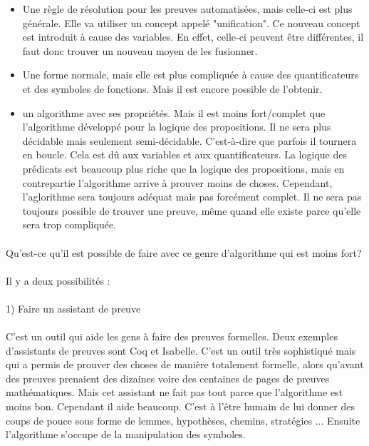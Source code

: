 \begin{itemize}

  \item Une règle de résolution pour les preuves automatisées, mais celle-ci est plus générale. Elle va utiliser un concept appelé "unification". Ce nouveau concept est introduit à cause des variables. En effet, celle-ci peuvent être différentes, il faut donc trouver un nouveau moyen de les fusionner.
  \item Une forme normale, mais elle est plus compliquée à cause des quantificateurs et des symboles de fonctions. Mais il est encore possible de l'obtenir.
  \item un algorithme avec ses propriétés. Mais il est moins fort/complet que l'algorithme développé pour la logique des propositions. Il ne sera plus décidable mais seulement semi-décidable. C'est-à-dire que parfois il tournera en boucle. Cela est dû aux variables et aux quantificateurs. La logique des prédicats est beaucoup plus riche que la logique des propositions, mais en contrepartie l'algorithme arrive à prouver moins de choses. Cependant, l'aglorithme sera toujours adéquat mais pas forcément complet. Il ne sera pas toujours possible de trouver une preuve, même quand elle existe parce qu'elle sera trop compliquée.

\end{itemize}

\paragraph{}
Qu'est-ce qu'il est possible de faire avec ce genre d'algorithme qui est moins fort?

\paragraph{}
Il y a deux possibilités : 
\paragraph{}

1) Faire un assistant de preuve

\paragraph{}
    C'est un outil qui aide les gens à faire des preuves formelles. Deux exemples d'assistants de preuves sont Coq et Isabelle. C'est un outil très sophistiqué mais qui a permis de prouver des choses de manière totalement formelle, alors qu'avant des preuves prenaient des dizaines voire des centaines de pages de preuves mathématiques. Mais cet assistant ne fait pas tout parce que l'algorithme est moins bon. Cependant il aide beaucoup. C'est à l'être humain de lui donner des coups de pouce sous forme de lemmes, hypothèses, chemins, stratégies ... Ensuite l'algorithme s'occupe de la manipulation des symboles.

